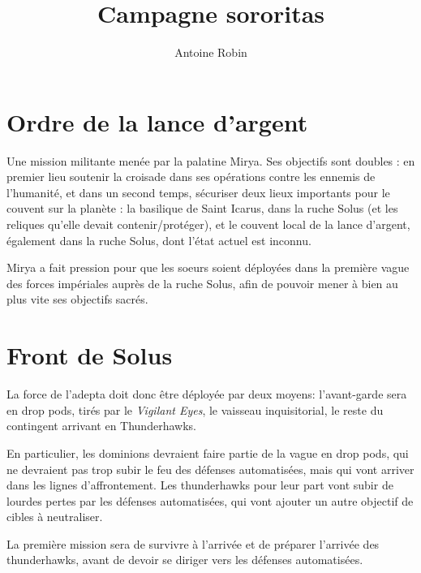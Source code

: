 \documentclass[10pt,a4paper]{book}
\author{ Antoine Robin}
\title{Campagne sororitas}
\begin{document}
\chapter{Ordre de la lance d'argent}
Une mission militante menée par la palatine Mirya. Ses objectifs sont doubles : en premier lieu soutenir la croisade dans ses opérations contre les ennemis de l'humanité, et dans un second temps, sécuriser deux lieux importants pour le couvent sur la planète : la basilique de Saint Icarus, dans la ruche Solus (et les reliques qu'elle devait contenir/protéger), et le couvent local de la lance d'argent, également dans la ruche Solus, dont l'état actuel est inconnu.

Mirya a fait pression pour que les soeurs soient déployées dans la première vague des forces impériales auprès de la ruche Solus, afin de pouvoir mener à bien au plus vite ses objectifs sacrés.

\chapter{Front de Solus}
La force de l'adepta doit donc être déployée par deux moyens: l'avant-garde sera en drop pods, tirés par le \emph{Vigilant Eyes}, le vaisseau inquisitorial, le reste du contingent arrivant en Thunderhawks. 

En particulier, les dominions devraient faire partie de la vague en drop pods, qui ne devraient pas trop subir le feu des défenses automatisées, mais qui vont arriver dans les lignes d'affrontement. Les thunderhawks pour leur part vont subir de lourdes pertes par les défenses automatisées, qui vont ajouter un autre objectif de cibles à neutraliser.

La première mission sera de survivre à l'arrivée et de préparer l'arrivée des thunderhawks, avant de devoir se diriger vers les défenses automatisées.
\end{document}
